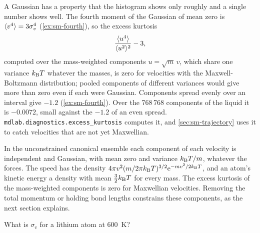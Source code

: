 A Gaussian has a property that the histogram shows only roughly and a
single number shows well. The fourth moment of the Gaussian of mean zero
is $\langle v^4 \rangle = 3\sigma_v^4$ (\cref{ex:sm-fourth}), so the excess
kurtosis
\begin{equation*}
   \frac{\langle u^4 \rangle}{\langle u^2 \rangle^2} - 3 ,
\end{equation*}
computed over the mass-weighted components $u = \sqrt{m}\,v$, which share
one variance $k_{\mathrm{B}} T$ whatever the masses, is zero for velocities with the
Maxwell-Boltzmann distribution; pooled components of different variances
would give more than zero even if each were Gaussian. Components spread
evenly over an interval give $-1.2$ (\cref{ex:sm-fourth}). Over the
768\,768 components of the liquid it is $-0.0072$, small against the
$-1.2$ of an even spread. \texttt{mdlab.diagnostics.excess\_kurtosis}
computes it, and \cref{sec:sm-trajectory} uses it to catch velocities that
are not yet Maxwellian.

\begin{keyidea}
In the unconstrained canonical ensemble each component of each velocity
is independent and Gaussian, with mean zero and variance $k_{\mathrm{B}} T/m$, whatever the forces.
The speed has the density $4\pi v^2(m/2\pi k_{\mathrm{B}} T)^{3/2}\mathrm{e}^{-mv^2/
2k_{\mathrm{B}} T}$, and an atom's kinetic energy a density with mean $\frac32k_{\mathrm{B}} T$
for every mass. The excess kurtosis of the mass-weighted components is
zero for Maxwellian velocities. Removing the total momentum or holding
bond lengths constrains these components, as the next section explains.
\end{keyidea}


\begin{selfcheck}
What is $\sigma_v$ for a lithium atom at \SI{600}{\kelvin}?
\end{selfcheck}
